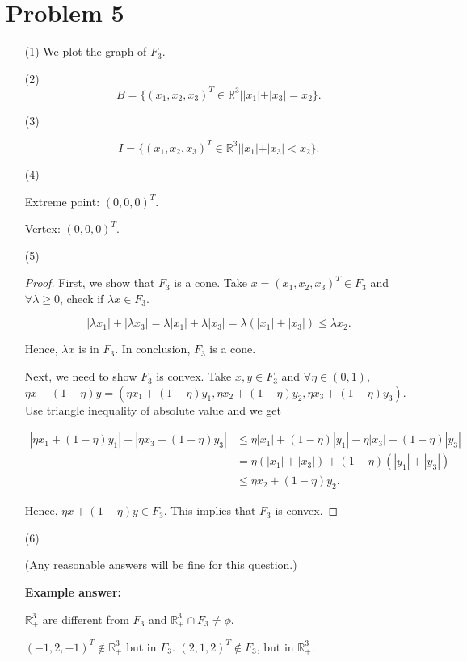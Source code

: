 \documentclass[12pt]{article}
\begin{document}
\section*{Problem 5}

\begin{enumerate}
\item [(1)]
We plot the graph of $F_3$.


\item [(2)]
$$
B = \{(x_1, x_2, x_3)^T \in \mathbb R^3 | |x_1| + |x_3| = x_2 \}.
$$



\item [(3)]

$$
I = \{(x_1, x_2, x_3)^T \in \mathbb R^3 | |x_1| + |x_3| < x_2 \}.
$$


\item [(4)]

Extreme point: $(0, 0, 0)^T$.

Vertex: $(0, 0, 0)^T$.

\item [(5)]
\begin{proof}

First, we show that $F_3$ is a cone. Take $x = (x_1, x_2, x_3)^T \in F_3$ and $\forall \lambda \geqslant 0$, check if $\lambda x \in F_3$. 

$$
|\lambda x_1| + |\lambda x_3| = \lambda |x_1| + \lambda |x_3| = \lambda (|x_1| + |x_3|) \leqslant \lambda x_2.
$$

Hence, $\lambda x$ is in $F_3$. In conclusion, $F_3$ is a cone.

Next, we need to show $F_3$ is convex. Take $x, y \in F_3$ and $\forall \eta \in (0, 1)$, $\eta x + (1- \eta) y = (\eta x_1 + (1-\eta)y_1, \eta x_2 + (1-\eta)y_2, \eta x_3 + (1-\eta)y_3)$. Use triangle inequality of absolute value and we get

$$
\begin{aligned}
|\eta x_1 + (1-\eta)y_1| + |\eta x_3 + (1-\eta)y_3| & \leqslant \eta |x_1| + (1-\eta)|y_1| + \eta |x_3| + (1-\eta)|y_3| \\
& = \eta (|x_1|+|x_3|) + (1-\eta)(|y_1|+|y_3|) \\
& \leqslant \eta x_2 + (1-\eta) y_2.
\end{aligned}
$$

Hence, $\eta x + (1- \eta) y \in F_3$. This implies that $F_3$ is convex.

\end{proof}

\item [(6)]

(Any reasonable answers will be fine for this question.)

\textbf{Example answer:}

$\mathbb R_+^3$ are different from $F_3$ and $\mathbb R_+^3 \cap F_3 \neq \phi$. 

$(-1, 2, -1)^T \notin \mathbb R_+^3$ but in $F_3$. $(2,1,2)^T \notin F_3$, but in $\mathbb R_+^3$.

\end{enumerate}
\end{document}
